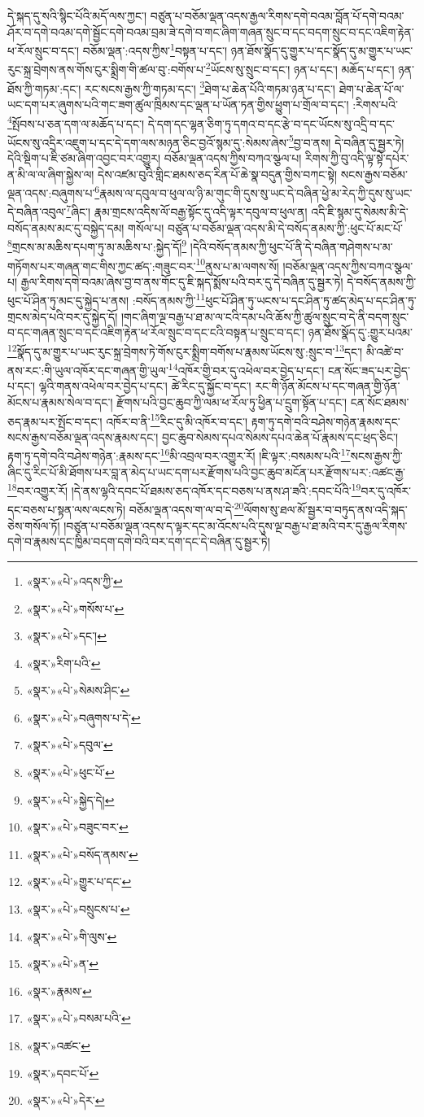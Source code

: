 དེ་སྐད་དུ་སའི་སྙིང་པོའི་མདོ་ལས་ཀྱང་། བཙུན་པ་བཅོམ་ལྡན་འདས་རྒྱལ་རིགས་དགེ་བའམ་བློན་པོ་དགེ་བའམ་ཤོར་བ་དགེ་བའམ་དགེ་སྦྱོང་དགེ་བའམ་བྲམ་ཟེ་དགེ་བ་གང་ཞིག་གཞན་སྲུང་བ་དང་བདག་སྲུང་བ་དང་འཇིག་རྟེན་ཕ་རོལ་སྲུང་བ་དང་། བཅོམ་ལྡན་:འདས་ཀྱིས་\footnote{«སྣར་»«པེ་»འདས་ཀྱི་}བསྟན་པ་དང་། ཉན་ཐོས་སྣོད་དུ་གྱུར་པ་དང་སྣོད་དུ་མ་གྱུར་པ་ཡང་རུང་སྐྲ་བྲེགས་ནས་གོས་ངུར་སྨྲིག་གི་ཚལ་བུ་:བགོས་པ་\footnote{«སྣར་»«པེ་»གསོས་པ་}ཡོངས་སུ་སྲུང་བ་དང་། ཉན་པ་དང་། མཆོད་པ་དང་། ཉན་ཐོས་ཀྱི་གཏམ་:དང་། རང་སངས་རྒྱས་ཀྱི་གཏམ་དང་། \footnote{«སྣར་»«པེ་»དང་།  }ཐེག་པ་ཆེན་པོའི་གཏམ་ཉན་པ་དང་། ཐེག་པ་ཆེན་པོ་ལ་ཡང་དག་པར་ཞུགས་པའི་གང་ཟག་ཚུལ་ཁྲིམས་དང་ལྡན་པ་ཡོན་ཏན་གྱིས་ཕྱུག་པ་གྲོལ་བ་དང་། :རིགས་པའི་\footnote{«སྣར་»རིག་པའི་}སྤོབས་པ་ཅན་དག་ལ་མཆོད་པ་དང་། དེ་དག་དང་ལྷན་ཅིག་ཏུ་དགའ་བ་དང་རྩེ་བ་དང་ཡོངས་སུ་འདྲི་བ་དང་ཡོངས་སུ་འདྲིར་འཇུག་པ་དང་དེ་དག་ལས་མཉན་ཅིང་བྱའོ་སྙམ་དུ་:སེམས་ཞེས་\footnote{«སྣར་»«པེ་»སེམས་ཤིང་}བྱ་བ་ནས། དེ་བཞིན་དུ་སྦྱར་ཏེ། དེའི་སྡིག་པ་ཇི་ཙམ་ཞིག་འབྱང་བར་འགྱུར། བཅོམ་ལྡན་འདས་ཀྱིས་བཀའ་སྩལ་པ། རིགས་ཀྱི་བུ་འདི་ལྟ་སྟེ་དཔེར་ན་མི་ལ་ལ་ཞིག་སྐྱེས་ལ། དེས་འཛམ་བུའི་གླིང་ཐམས་ཅད་རིན་པོ་ཆེ་སྣ་བདུན་གྱིས་བཀང་སྟེ། སངས་རྒྱས་བཅོམ་ལྡན་འདས་:བཞུགས་པ་\footnote{«སྣར་»«པེ་»བཞུགས་པ་དེ་}རྣམས་ལ་དབུལ་བ་ཕུལ་ལ་ཉི་མ་གུང་གི་དུས་སུ་ཡང་དེ་བཞིན་ཕྱེ་མ་རེད་ཀྱི་དུས་སུ་ཡང་དེ་བཞིན་འབུལ་\footnote{«སྣར་»«པེ་»དབུལ་}ཞིང་། རྣམ་གྲངས་འདིས་ལོ་བརྒྱ་སྟོང་དུ་འདི་ལྟར་དབུལ་བ་ཕུལ་ན། འདི་ཇི་སྙམ་དུ་སེམས་མི་དེ་བསོད་ནམས་མང་དུ་བསྐྱེད་དམ། གསོལ་པ། བཙུན་པ་བཅོམ་ལྡན་འདས་མི་དེ་བསོད་ནམས་ཀྱི་:ཕུང་པོ་མང་པོ་\footnote{«སྣར་»«པེ་»ཕུང་པོ་}གྲངས་མ་མཆིས་དཔག་ཏུ་མ་མཆིས་པ་:སྐྱེད་དོ།\footnote{«སྣར་»«པེ་»སྐྱེད་དེ།} །དེའི་བསོད་ནམས་ཀྱི་ཕུང་པོ་ནི་དེ་བཞིན་གཤེགས་པ་མ་གཏོགས་པར་གཞན་གང་གིས་ཀྱང་ཚད་:གཟུང་བར་\footnote{«སྣར་»«པེ་»བཟུང་བར་}ནུས་པ་མ་ལགས་སོ། །བཅོམ་ལྡན་འདས་ཀྱིས་བཀའ་སྩལ་པ། རྒྱལ་རིགས་དགེ་བའམ་ཞེས་བྱ་བ་ནས་གོང་དུ་ཇི་སྐད་སྨོས་པའི་བར་དུ་དེ་བཞིན་དུ་སྦྱར་ཏེ། དེ་བསོད་ནམས་ཀྱི་ཕུང་པོ་ཤིན་ཏུ་མང་དུ་སྐྱེད་པ་ནས། :བསོད་ནམས་ཀྱི་\footnote{«སྣར་»«པེ་»བསོད་ནམས་}ཕུང་པོ་ཤིན་ཏུ་ཡངས་པ་དང་ཤིན་ཏུ་ཚད་མེད་པ་དང་ཤིན་ཏུ་གྲངས་མེད་པའི་བར་དུ་སྐྱེད་དོ། །གང་ཞིག་ལྔ་བརྒྱ་པ་ཐ་མ་ལ་ངའི་དམ་པའི་ཆོས་ཀྱི་ཚུལ་སྲུང་བ་དེ་ནི་བདག་སྲུང་བ་དང་གཞན་སྲུང་བ་དང་འཇིག་རྟེན་ཕ་རོལ་སྲུང་བ་དང་ངའི་བསྟན་པ་སྲུང་བ་དང་། ཉན་ཐོས་སྣོད་དུ་:གྱུར་པའམ་\footnote{«སྣར་»«པེ་»གྱུར་པ་དང་}སྣོད་དུ་མ་གྱུར་པ་ཡང་རུང་སྐྲ་བྲེགས་ཏེ་གོས་ངུར་སྨྲིག་བགོས་པ་རྣམས་ཡོངས་སུ་:སྲུང་བ་\footnote{«སྣར་»«པེ་»བསྲུངས་པ་}དང་། མི་འཚེ་བ་ནས་རང་:གི་ཡུལ་འཁོར་དང་གཞན་གྱི་ཡུལ་\footnote{«སྣར་»«པེ་»གི་ལུས་}འཁོར་གྱི་བར་དུ་འཕེལ་བར་བྱེད་པ་དང་། ངན་སོང་ཟད་པར་བྱེད་པ་དང་། ལྷའི་གནས་འཕེལ་བར་བྱེད་པ་དང་། ཚེ་རིང་དུ་སྐྱོང་བ་དང་། རང་གི་ཉོན་མོངས་པ་དང་གཞན་གྱི་ཉོན་མོངས་པ་རྣམས་སེལ་བ་དང་། རྫོགས་པའི་བྱང་ཆུབ་ཀྱི་ལམ་ཕ་རོལ་ཏུ་ཕྱིན་པ་དྲུག་སྟོན་པ་དང་། ངན་སོང་ཐམས་ཅད་རྣམ་པར་སྤོང་བ་དང་། འཁོར་བ་ནི་\footnote{«སྣར་»«པེ་»ན་}རིང་དུ་མི་འཁོར་བ་དང་། རྟག་ཏུ་དགེ་བའི་བཤེས་གཉེན་རྣམས་དང་སངས་རྒྱས་བཅོམ་ལྡན་འདས་རྣམས་དང་། བྱང་ཆུབ་སེམས་དཔའ་སེམས་དཔའ་ཆེན་པོ་རྣམས་དང་ཕྲད་ཅིང་། རྟག་ཏུ་དགེ་བའི་བཤེས་གཉེན་:རྣམས་དང་\footnote{«སྣར་»རྣམས་}མི་འབྲལ་བར་འགྱུར་རོ། །ཇི་ལྟར་:བསམས་པའི་\footnote{«སྣར་»«པེ་»བསམ་པའི་}སངས་རྒྱས་ཀྱི་ཞིང་དུ་རིང་པོ་མི་ཐོགས་པར་བླ་ན་མེད་པ་ཡང་དག་པར་རྫོགས་པའི་བྱང་ཆུབ་མངོན་པར་རྫོགས་པར་:འཚང་རྒྱ་\footnote{«སྣར་»འཚང་}བར་འགྱུར་རོ། །དེ་ནས་ལྷའི་དབང་པོ་ཐམས་ཅད་འཁོར་དང་བཅས་པ་ནས་ཤ་ཟའི་:དབང་པོའི་\footnote{«སྣར་»དབང་པོ་}བར་དུ་འཁོར་དང་བཅས་པ་སྟན་ལས་ལངས་ཏེ། བཅོམ་ལྡན་འདས་ག་ལ་བ་དེ་\footnote{«སྣར་»«པེ་»དེར་}ལོགས་སུ་ཐལ་མོ་སྦྱར་བ་བཏུད་ནས་འདི་སྐད་ཅེས་གསོལ་ཏོ། །བཙུན་པ་བཅོམ་ལྡན་འདས་ད་ལྟར་དང་མ་འོངས་པའི་དུས་ལྔ་བརྒྱ་པ་ཐ་མའི་བར་དུ་རྒྱལ་རིགས་དགེ་བ་རྣམས་དང་ཁྱིམ་བདག་དགེ་བའི་བར་དག་དང་དེ་བཞིན་དུ་སྦྱར་ཏེ། 